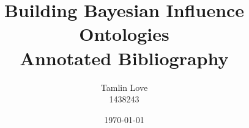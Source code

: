 \documentclass [11pt]{article}
\title{Building Bayesian Influence Ontologies\\Annotated Bibliography}
\author{Tamlin Love\\1438243}
\date{\today}
\begin{document}
\maketitle
\nocite{*}


\end{document}
